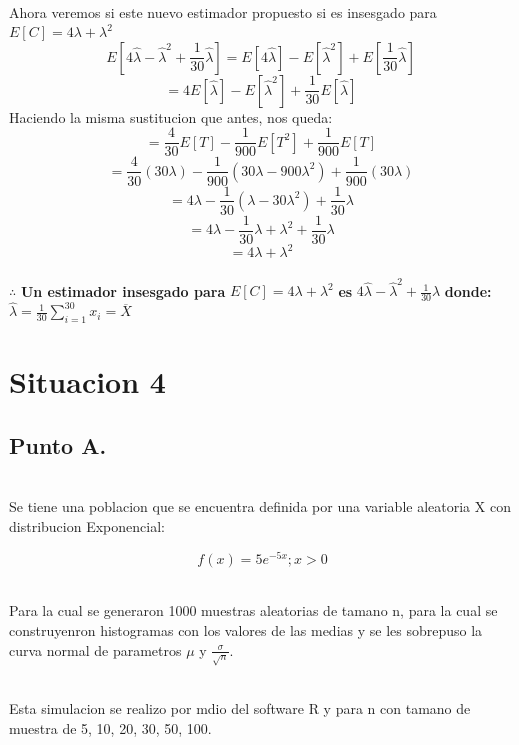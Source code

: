 \documentclass[letterpaper,12pt,onecolumn,titlepage]{article}
\begin{document}
~\\ Ahora veremos si este nuevo estimador propuesto si es insesgado para $E[C] = 4\lambda + {\lambda}^2$
$$E[4\hat{\lambda}-\hat{\lambda}^2+\frac{1}{30}\hat{\lambda}]=E[4\hat{\lambda}]-E[\hat{\lambda}^2]+E[\frac{1}{30}\hat{\lambda}]$$
$$=4E[\hat{\lambda}]-E[\hat{\lambda}^2]+\frac{1}{30}E[\hat{\lambda}]$$
Haciendo la misma sustitucion que antes, nos queda:
$$=\frac{4}{30}E[T]-\frac{1}{900}E[T^2]+\frac{1}{900}E[T]$$
$$=\frac{4}{30}(30\lambda)-\frac{1}{900}(30\lambda-900{\lambda}^2)+\frac{1}{900}(30\lambda)$$
$$=4\lambda-\frac{1}{30}(\lambda-30{\lambda}^2)+\frac{1}{30}\lambda$$
$$=4\lambda-\frac{1}{30}\lambda+{\lambda}^2+\frac{1}{30}\lambda$$
$$=4\lambda+{\lambda}^2$$
~\\$\therefore$ \textbf{Un estimador insesgado para} $E[C]=4\lambda+{\lambda}^2$ \textbf{es} $4\hat{\lambda}-\hat{\lambda}^2+\frac{1}{30}\hat{\lambda}$ \textbf{donde:} $\hat{\lambda}=\frac{1}{30} \sum_{i=1}^{30}x_{i} = \overline{X}$

\pagebreak\section{Situacion 4}
\subsection{Punto A.}
~\\Se tiene una poblacion que se encuentra definida por una variable aleatoria X con distribucion Exponencial:

$$\ f(x)=5e^{-5x} ; x>0$$

~\\ Para la cual se generaron 1000 muestras aleatorias de tamano n, para la cual se construyenron histogramas con los valores de las medias y se les sobrepuso la curva normal de parametros $\mu$ y $\frac{\sigma}{\sqrt{n}}$. 

~\\ Esta simulacion se realizo por mdio del software R y para n con tamano de muestra de 5, 10, 20, 30, 50, 100.
\end{document}
